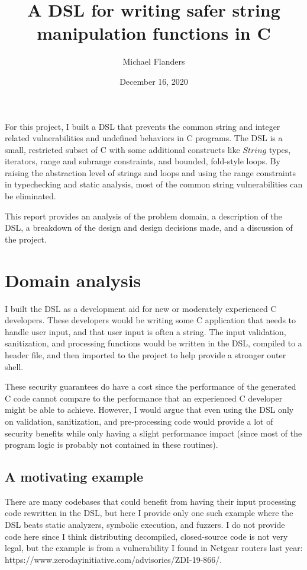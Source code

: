 \documentclass[letterpaper]{article}
\title{A DSL for writing safer string manipulation functions in C}
\author{Michael Flanders}
\date{December 16, 2020}
\begin{document}
\maketitle


For this project, I built a DSL that prevents the common string and
integer related vulnerabilities and undefined behaviors in C programs.
The DSL is a small, restricted subset of C with some additional constructs
like $String$ types, iterators, range and subrange constraints, and bounded,
fold-style loops. By raising the abstraction level of strings and loops
and using the range constraints in typechecking and static analysis,
most of the common string vulnerabilities can be eliminated.

This report provides an analysis of the problem domain, a description
of the DSL, a breakdown of the design and design decisions made, and
a discussion of the project.

\section{Domain analysis}

I built the DSL as a development aid for new or moderately experienced
C developers. These developers would be writing some C application
that needs to handle user input, and that user input is often a string.
The input validation, sanitization, and processing functions would be
written in the DSL, compiled to a header file, and then imported to
the project to help provide a stronger outer shell.

These security guarantees do have a cost since the performance of the
generated C code cannot compare to the performance that an experienced
C developer might be able to achieve. However, I would argue that even
using the DSL only on validation, sanitization, and pre-processing code would
provide a lot of security benefits while only having a slight performance
impact (since most of the program logic is probably not contained in these
routines).

\subsection{A motivating example}

There are many codebases that could benefit from having their input processing
code rewritten in the DSL, but here I provide only one such example where the
DSL beats static analyzers, symbolic execution, and fuzzers. I do not
provide code here since I think distributing decompiled, closed-source code
is not very legal, but the example is from a vulnerability I found in Netgear
routers last year: https://www.zerodayinitiative.com/advisories/ZDI-19-866/.
\end{document}
